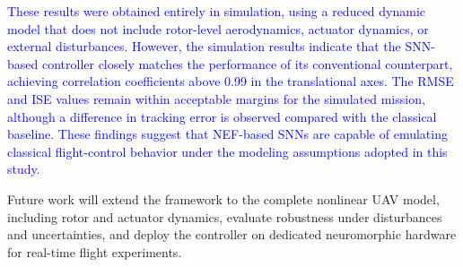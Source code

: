 \documentclass[conference]{IEEEtran}
\begin{document}
\textcolor{blue}{These results were obtained entirely in simulation, using a reduced dynamic model that does not include rotor-level aerodynamics, actuator dynamics, or external disturbances. However, the simulation results indicate that the SNN-based controller closely matches the performance of its conventional counterpart, achieving correlation coefficients above 0.99 in the translational axes. The RMSE and ISE values remain within acceptable margins for the simulated mission, although a difference in tracking error is observed compared with the classical baseline. These findings suggest that NEF-based SNNs are capable of emulating classical flight-control behavior under the modeling assumptions adopted in this study.}



Future work will extend the framework to the complete nonlinear UAV model, including rotor and actuator dynamics, evaluate robustness under disturbances and uncertainties, and deploy the controller on dedicated neuromorphic hardware for real-time flight experiments.




\end{document}
